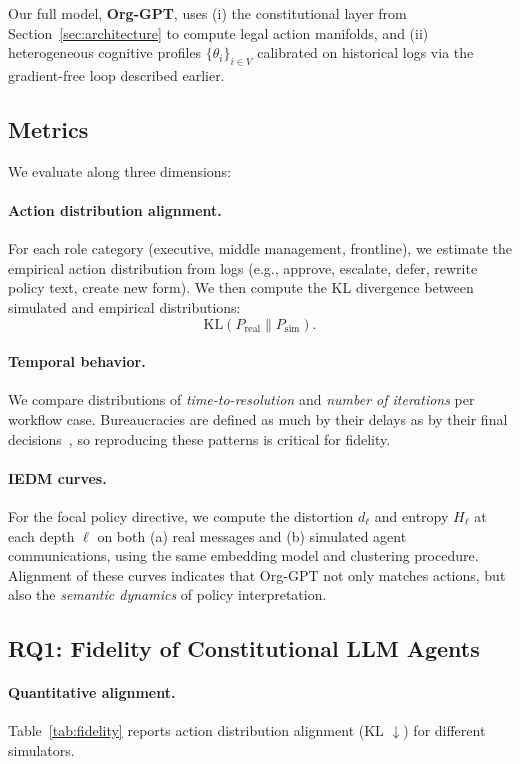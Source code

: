 \documentclass{article}
\begin{document}
Our full model, \textbf{Org-GPT}, uses (i) the constitutional layer from Section~\ref{sec:architecture} to compute legal action manifolds, and (ii) heterogeneous cognitive profiles $\{\theta_i\}_{i \in V}$ calibrated on historical logs via the gradient-free loop described earlier.

\subsection{Metrics}

We evaluate along three dimensions:

\paragraph{Action distribution alignment.}
For each role category (executive, middle management, frontline), we estimate the empirical action distribution from logs (e.g., approve, escalate, defer, rewrite policy text, create new form). We then compute the KL divergence between simulated and empirical distributions:
\[
    \mathrm{KL}(P_{\text{real}} \parallel P_{\text{sim}}).
\]

\paragraph{Temporal behavior.}
We compare distributions of \emph{time-to-resolution} and \emph{number of iterations} per workflow case. Bureaucracies are defined as much by their delays as by their final decisions~\citep{weber1978economy}, so reproducing these patterns is critical for fidelity.

\paragraph{IEDM curves.}
For the focal policy directive, we compute the distortion $d_\ell$ and entropy $H_\ell$ at each depth $\ell$ on both (a) real messages and (b) simulated agent communications, using the same embedding model and clustering procedure. Alignment of these curves indicates that Org-GPT not only matches actions, but also the \emph{semantic dynamics} of policy interpretation.

\subsection{RQ1: Fidelity of Constitutional LLM Agents}

\paragraph{Quantitative alignment.}
Table~\ref{tab:fidelity} reports action distribution alignment (KL $\downarrow$) for different simulators.
\end{document}
